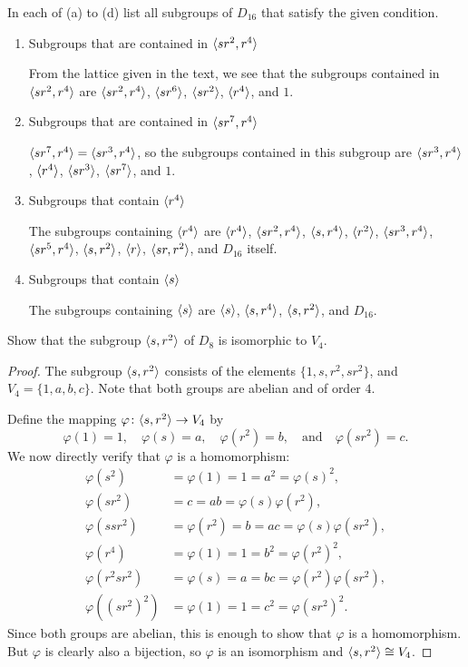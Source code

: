 In each of (a) to (d) list all subgroups of $D_{16}$ that
satisfy the given condition.
\begin{enumerate}
\item Subgroups that are contained in $\langle{sr^2,r^4}\rangle$
  \begin{solution}
    From the lattice given in the text, we see that the subgroups
    contained in $\langle{sr^2,r^4}\rangle$ are $\langle{sr^2,r^4}\rangle$, $\langle{sr^6}\rangle$,
    $\langle{sr^2}\rangle$, $\langle{r^4}\rangle$, and $1$.
  \end{solution}
\item Subgroups that are contained in $\langle{sr^7, r^4}\rangle$
  \begin{solution}
    $\langle{sr^7, r^4}\rangle = \langle{sr^3, r^4}\rangle$, so the subgroups contained in
    this subgroup are $\langle{sr^3, r^4}\rangle$, $\langle{r^4}\rangle$, $\langle{sr^3}\rangle$,
    $\langle{sr^7}\rangle$, and $1$.
  \end{solution}
\item Subgroups that contain $\langle{r^4}\rangle$
  \begin{solution}
    The subgroups containing $\langle{r^4}\rangle$ are $\langle{r^4}\rangle$,
    $\langle{sr^2,r^4}\rangle$, $\langle{s,r^4}\rangle$, $\langle{r^2}\rangle$, $\langle{sr^3,r^4}\rangle$,
    $\langle{sr^5,r^4}\rangle$, $\langle{s, r^2}\rangle$, $\langle{r}\rangle$, $\langle{sr, r^2}\rangle$, and
    $D_{16}$ itself.
  \end{solution}
\item Subgroups that contain $\langle{s}\rangle$
  \begin{solution}
    The subgroups containing $\langle{s}\rangle$ are $\langle{s}\rangle$, $\langle{s,r^4}\rangle$,
    $\langle{s,r^2}\rangle$, and $D_{16}$.
  \end{solution}
\end{enumerate}

 Show that the subgroup $\langle{s, r^2}\rangle$ of $D_8$ is
isomorphic to $V_4$.
\begin{proof}
  The subgroup $\langle{s, r^2}\rangle$ consists of the elements
  $\{1, s, r^2, sr^2\}$, and $V_4 = \{1, a, b, c\}$. Note that both
  groups are abelian and of order $4$.

  Define the mapping $\varphi\colon\langle{s,r^2}\rangle\to V_4$ by
  \begin{equation*}
    \varphi(1) = 1,
    \quad
    \varphi(s) = a,
    \quad
    \varphi(r^2) = b,
    \quad\text{and}\quad
    \varphi(sr^2) = c.
  \end{equation*}
  We now directly verify that $\varphi$ is a homomorphism:
  \begin{align*}
    \varphi(s^2) &= \varphi(1) = 1 = a^2 = \varphi(s)^2, \\
    \varphi(sr^2) &= c = ab = \varphi(s)\varphi(r^2), \\
    \varphi(ssr^2) &= \varphi(r^2) = b = ac = \varphi(s)\varphi(sr^2), \\
    \varphi(r^4) &= \varphi(1) = 1 = b^2 = \varphi(r^2)^2, \\
    \varphi(r^2sr^2) &= \varphi(s) = a = bc = \varphi(r^2)\varphi(sr^2), \\
    \varphi((sr^2)^2) &= \varphi(1) = 1 = c^2 = \varphi(sr^2)^2.
  \end{align*}
  Since both groups are abelian, this is enough to show that $\varphi$
  is a homomorphism. But $\varphi$ is clearly also a bijection, so
  $\varphi$ is an isomorphism and $\langle{s,r^2}\rangle\cong V_4$.
\end{proof}
